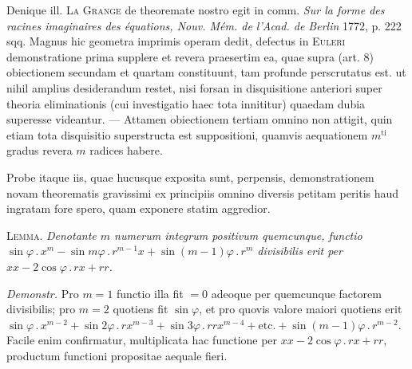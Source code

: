 Denique ill. \textsc{La Grange} de theoremate nostro egit in comm. \textit{Sur la forme des racines imaginaires des équations, Nouv. Mém. de l'Acad. de Berlin} 1772, p. 222 sqq. Magnus hic geometra imprimis operam dedit, defectus in \textsc{Euleri} demonstratione prima supplere et revera praesertim ea, quae supra (art. 8) obiectionem secundam et quartam constituunt, tam profunde perscrutatus est. ut nihil amplius desiderandum restet, nisi forsan in disquisitione anteriori super theoria eliminationis (cui investigatio haec tota innititur) quaedam dubia superesse videantur. --- Attamen obiectionem tertiam omnino non attigit, quin etiam tota disquisitio superstructa est suppositioni, quamvis aequationem $m^{\mathrm{ti}}$ gradus revera $m$ radices habere.

Probe itaque iis, quae hucusque exposita sunt, perpensis, demonstrationem novam theorematis gravissimi ex principiis omnino diversis petitam peritis haud ingratam fore spero, quam exponere statim aggredior.

\textsc{Lemma.} \textit{Denotante $m$ numerum integrum positivum quemcunque, functio $\sin\varphi\mathbin{.}x^m-\sin m\varphi\mathbin{.}r^{m-1}x+\sin(m-1)\varphi\mathbin{.}r^m$ divisibilis erit per $xx-2\cos\varphi\mathbin{.}rx+rr$.}

\textit{Demonstr.} Pro $m=1$ functio illa fit $=0$ adeoque per quemcunque factorem divisibilis; pro $m=2$ quotiens fit $\sin\varphi$, et pro quovis valore maiori quotiens erit $\sin\varphi\mathbin{.}x^{m-2}+\sin2\varphi\mathbin{.}rx^{m-3}+\sin3\varphi\mathbin{.}rrx^{m-4}+\text{etc.}+\sin(m-1)\varphi\mathbin{.}r^{m-2}$. Facile enim confirmatur, multiplicata hac functione per $xx-2\cos\varphi\mathbin{.}rx+rr$, productum functioni propositae aequale fieri.
